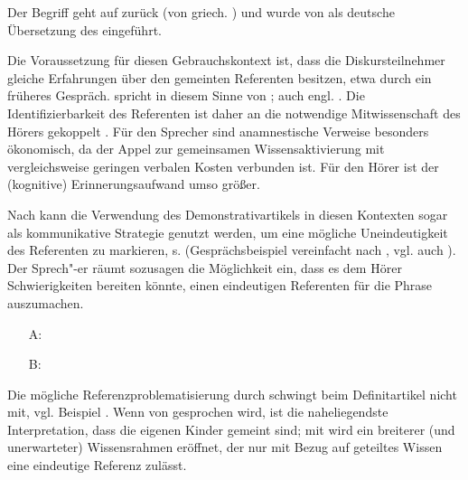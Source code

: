 \begin{exe}
	\ex \label{ex:anamn}   
\end{exe}

Der Begriff  geht auf \textcite{Buhler1934} zurück (von griech.  ) und wurde von \textcite{Himmelmann1997} als deutsche Übersetzung des  \parencite{Himmelmann1996,Diessel1999}  eingeführt.

Die Voraussetzung für diesen Gebrauchskontext ist, dass die Diskursteilnehmer gleiche Erfahrungen über den gemeinten Referenten besitzen, etwa durch ein früheres Gespräch. \textcite[44]{Bisle-Muller1991} spricht in diesem Sinne von ; auch engl.  \parencite[106]{Diessel1999}. Die Identifizierbarkeit des Referenten ist daher an die notwendige Mitwissenschaft des Hörers gekoppelt \parencite[72]{Szczepaniak2011a}. Für  den Sprecher sind anamnestische Verweise besonders ökonomisch, da der Appel zur gemeinsamen Wissensaktivierung mit vergleichsweise geringen verbalen Kosten verbunden ist. Für den Hörer ist der (kognitive) Erinnerungsaufwand umso größer.

Nach \textcite[79-80]{Bisle-Muller1991} kann die Verwendung des Demonstrativartikels in diesen Kontexten sogar als kommunikative Strategie genutzt werden, um eine mögliche Uneindeutigkeit des Referenten zu markieren, s.  (Gesprächsbeispiel vereinfacht nach \citealt[637]{Auer1984}, vgl. auch \citealt[58]{Himmelmann1997}). Der Sprech"-er räumt sozusagen die Möglichkeit ein, dass es dem Hörer Schwierigkeiten bereiten könnte, einen eindeutigen Referenten für die Phrase  auszumachen. 

\begin{exe}
	\ex \label{ex:auer} 
	\begin{itemize}
		\item[A:]  
		\item[B:]  
	\end{itemize}
\end{exe}

Die mögliche Referenzproblematisierung durch  schwingt beim Definitartikel nicht mit, vgl. Beispiel  \parencites()()[][80]{Bisle-Muller1991}[][70]{Himmelmann1997}. Wenn von  gesprochen wird, ist die naheliegendste Interpretation, dass die eigenen Kinder gemeint sind; mit  wird ein breiterer (und unerwarteter) Wissensrahmen eröffnet, der nur mit Bezug auf geteiltes Wissen eine eindeutige Referenz zulässt.    

